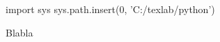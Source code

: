 \newcommand{\templatesroot}{C:/texlab}


\begin{pycode}
import sys
sys.path.insert(0, 'C:/texlab/python')
\end{pycode}

\title{}
\author{}
\date{\today}



\begin{theorem}{}{}
    Blabla
\end{theorem}

